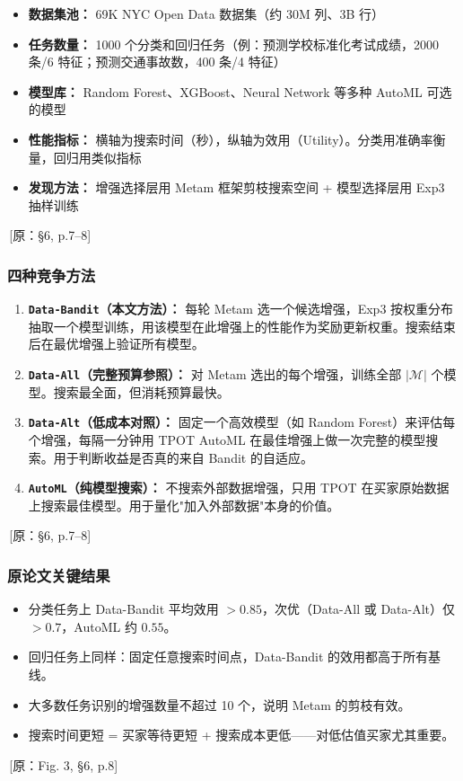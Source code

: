 \documentclass[12pt,a4paper]{article}
\newcommand{\srcref}[1]{\textcolor{black!65}{\footnotesize\,[原：#1]}}
\theoremstyle{definition}
\begin{document}
\begin{itemize}[leftmargin=*]
    \item \textbf{数据集池：} 69K NYC Open Data 数据集（约 30M 列、3B 行）
    \item \textbf{任务数量：} 1000 个分类和回归任务（例：预测学校标准化考试成绩，2000 条/6 特征；预测交通事故数，400 条/4 特征）
    \item \textbf{模型库：} Random Forest、XGBoost、Neural Network 等多种 AutoML 可选的模型
    \item \textbf{性能指标：} 横轴为搜索时间（秒），纵轴为效用（Utility）。分类用准确率衡量，回归用类似指标
    \item \textbf{发现方法：} 增强选择层用 Metam 框架剪枝搜索空间 + 模型选择层用 Exp3 抽样训练
\end{itemize}
\srcref{§6, p.7--8}

\subsubsection{四种竞争方法}

\begin{enumerate}[leftmargin=*]
    \item \textbf{\texttt{Data-Bandit}（本文方法）：} 每轮 Metam 选一个候选增强，Exp3 按权重分布抽取一个模型训练，用该模型在此增强上的性能作为奖励更新权重。搜索结束后在最优增强上验证所有模型。
    \item \textbf{\texttt{Data-All}（完整预算参照）：} 对 Metam 选出的每个增强，训练全部 $|\mathcal{M}|$ 个模型。搜索最全面，但消耗预算最快。
    \item \textbf{\texttt{Data-Alt}（低成本对照）：} 固定一个高效模型（如 Random Forest）来评估每个增强，每隔一分钟用 TPOT AutoML 在最佳增强上做一次完整的模型搜索。用于判断收益是否真的来自 Bandit 的自适应。
    \item \textbf{\texttt{AutoML}（纯模型搜索）：} 不搜索外部数据增强，只用 TPOT 在买家原始数据上搜索最佳模型。用于量化"加入外部数据"本身的价值。
\end{enumerate}
\srcref{§6, p.7--8}

\subsubsection{原论文关键结果}

\begin{itemize}[leftmargin=*]
    \item 分类任务上 Data-Bandit 平均效用 $>0.85$，次优（Data-All 或 Data-Alt）仅 $>0.7$，AutoML 约 $0.55$。
    \item 回归任务上同样：固定任意搜索时间点，Data-Bandit 的效用都高于所有基线。
    \item 大多数任务识别的增强数量不超过 10 个，说明 Metam 的剪枝有效。
    \item 搜索时间更短 = 买家等待更短 + 搜索成本更低——对低估值买家尤其重要。
\end{itemize}
\srcref{Fig. 3, §6, p.8}
\end{document}
